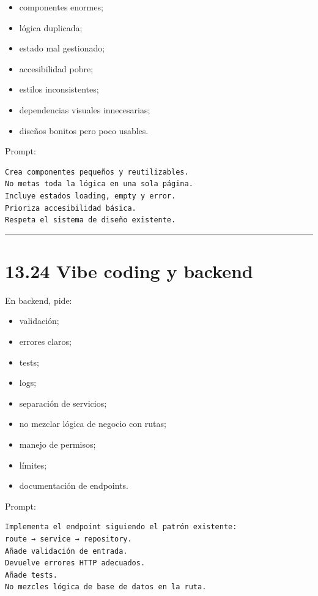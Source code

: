 \begin{itemize}
\tightlist
\item
  componentes enormes;
\item
  lógica duplicada;
\item
  estado mal gestionado;
\item
  accesibilidad pobre;
\item
  estilos inconsistentes;
\item
  dependencias visuales innecesarias;
\item
  diseños bonitos pero poco usables.
\end{itemize}

Prompt:

\begin{lstlisting}
Crea componentes pequeños y reutilizables.
No metas toda la lógica en una sola página.
Incluye estados loading, empty y error.
Prioriza accesibilidad básica.
Respeta el sistema de diseño existente.
\end{lstlisting}

\begin{center}\rule{0.5\linewidth}{0.5pt}\end{center}

\section{13.24 Vibe coding y backend}\label{vibe-coding-y-backend}

En backend, pide:

\begin{itemize}
\tightlist
\item
  validación;
\item
  errores claros;
\item
  tests;
\item
  logs;
\item
  separación de servicios;
\item
  no mezclar lógica de negocio con rutas;
\item
  manejo de permisos;
\item
  límites;
\item
  documentación de endpoints.
\end{itemize}

Prompt:

\begin{lstlisting}
Implementa el endpoint siguiendo el patrón existente:
route → service → repository.
Añade validación de entrada.
Devuelve errores HTTP adecuados.
Añade tests.
No mezcles lógica de base de datos en la ruta.
\end{lstlisting}

